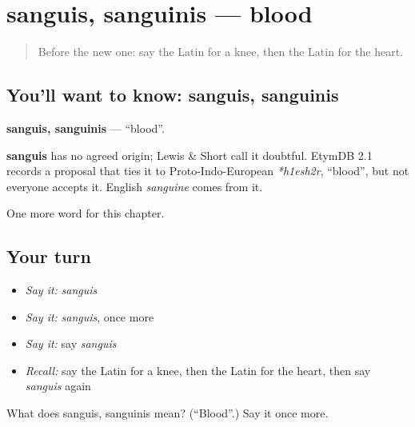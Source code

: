 \section[sanguis, sanguinis]{sanguis, sanguinis — blood}

\label{lesson:LA-C64-sanguis}



\begin{quote}
Before the new one: say the Latin for a knee, then the Latin for the heart.
\end{quote}

\subsection*{You'll want to know: sanguis, sanguinis}
\textbf{sanguis, sanguinis} — \textquotedblleft{}blood\textquotedblright{}.

\begin{cousinweb}
\textbf{sanguis} has no agreed origin; Lewis \& Short call it doubtful. EtymDB 2.1 records a proposal that ties it to Proto-Indo-European \emph{*h1esh2r}, \textquotedblleft{}blood\textquotedblright{}, but not everyone accepts it. English \emph{sanguine} comes from it.
\end{cousinweb}

\begin{grammarlens}[title={What you've built}]
One more word for this chapter.
\end{grammarlens}

\subsection*{Your turn}
\begin{itemize}
\raggedright
  \item \emph{Say it:} \emph{sanguis}
  \item \emph{Say it:} \emph{sanguis}, once more
  \item \emph{Say it:} say \emph{sanguis}
  \item \emph{Recall:} say the Latin for a knee, then the Latin for the heart, then say \emph{sanguis} again
\end{itemize}

\begin{tcolorbox}[breakable,colback=teal!4,colframe=teal!35!black,title={Before you move on}]
What does sanguis, sanguinis mean? (\textquotedblleft{}Blood\textquotedblright{}.) Say it once more.
\end{tcolorbox}
